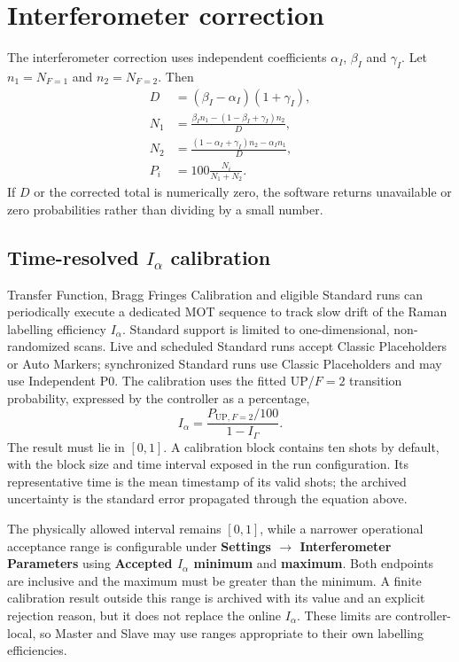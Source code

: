 \documentclass[11pt,oneside,openany]{book}
\newcommand{\ui}[1]{\textbf{#1}}
\begin{document}
\section{Interferometer correction}
The interferometer correction uses independent coefficients $\alpha_I$, $\beta_I$ and
$\gamma_I$. Let $n_1=N_{F=1}$ and $n_2=N_{F=2}$. Then
\begin{align}
  D &= (\beta_I-\alpha_I)(1+\gamma_I),\\
  N_1 &= \frac{\beta_I n_1-(1-\beta_I+\gamma_I)n_2}{D},\\
  N_2 &= \frac{(1-\alpha_I+\gamma_I)n_2-\alpha_I n_1}{D},\\
  P_i &= 100\frac{N_i}{N_1+N_2}.
\end{align}
If $D$ or the corrected total is numerically zero, the software returns unavailable or
zero probabilities rather than dividing by a small number.

\subsection{Time-resolved $I_\alpha$ calibration}
Transfer Function, Bragg Fringes Calibration and eligible Standard runs can periodically
execute a dedicated MOT sequence to track slow drift of the Raman labelling efficiency
$I_\alpha$. Standard support is limited to one-dimensional, non-randomized scans. Live
and scheduled Standard runs accept Classic Placeholders or Auto Markers; synchronized
Standard runs use Classic Placeholders and may use Independent P0. The
calibration uses the fitted UP/$F=2$ transition probability, expressed by the controller
as a percentage,
\begin{equation}
  I_\alpha=\frac{P_{\mathrm{UP},F=2}/100}{1-I_\Gamma}.
\end{equation}
The result must lie in $[0,1]$.  A calibration block contains ten shots by default, with
the block size and time interval exposed in the run configuration.  Its representative
time is the mean timestamp of its valid shots; the archived uncertainty is the standard
error propagated through the equation above.

The physically allowed interval remains $[0,1]$, while a narrower operational acceptance
range is configurable under \ui{Settings $\rightarrow$ Interferometer Parameters} using
\ui{Accepted $I_\alpha$ minimum} and \ui{maximum}.  Both endpoints are inclusive and the
maximum must be greater than the minimum.  A finite calibration result outside this range
is archived with its value and an explicit rejection reason, but it does not replace the
online $I_\alpha$.  These limits are controller-local, so Master and Slave may use ranges
appropriate to their own labelling efficiencies.
\end{document}
